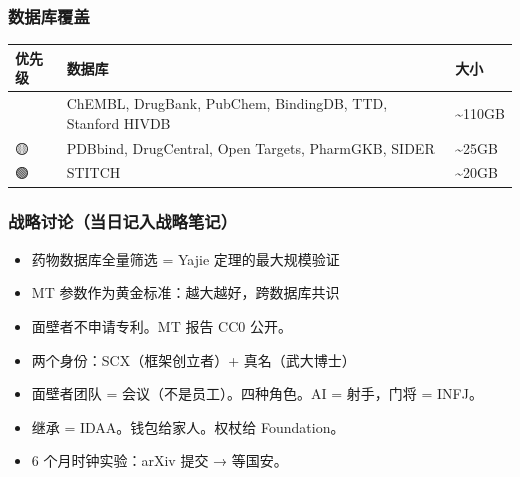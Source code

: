 \documentclass[
  12pt,
]{ctexart}
\providecommand{\tightlist}{%
  \setlength{\itemsep}{0pt}\setlength{\parskip}{0pt}}
\begin{document}
\subsubsection{数据库覆盖}\label{ux6570ux636eux5e93ux8986ux76d6}

\begin{longtable}[]{@{}
  >{\centering\arraybackslash}p{}
  >{\raggedright\arraybackslash}p{}
  >{\centering\arraybackslash}p{}@{}}
\toprule\noalign{}
\begin{minipage}[b]{\linewidth}\centering
优先级
\end{minipage} & \begin{minipage}[b]{\linewidth}\raggedright
数据库
\end{minipage} & \begin{minipage}[b]{\linewidth}\centering
大小
\end{minipage} \\
\midrule\noalign{}
\endhead
\bottomrule\noalign{}
\endlastfoot
🔴 & ChEMBL, DrugBank, PubChem, BindingDB, TTD, Stanford HIVDB &
\textasciitilde110GB \\
🟡 & PDBbind, DrugCentral, Open Targets, PharmGKB, SIDER &
\textasciitilde25GB \\
🟢 & STITCH & \textasciitilde20GB \\
\end{longtable}

\subsubsection{战略讨论（当日记入战略笔记）}\label{ux6218ux7565ux8ba8ux8bbaux5f53ux65e5ux8bb0ux5165ux6218ux7565ux7b14ux8bb0}

\begin{itemize}
\tightlist
\item
  药物数据库全量筛选 = Yajie 定理的最大规模验证
\item
  MT 参数作为黄金标准：越大越好，跨数据库共识
\item
  面壁者不申请专利。MT 报告 CC0 公开。
\item
  两个身份：SCX（框架创立者）+ 真名（武大博士）
\item
  面壁者团队 = 会议（不是员工）。四种角色。AI = 射手，门将 = INFJ。
\item
  继承 = IDAA。钱包给家人。权杖给 Foundation。
\item
  6 个月时钟实验：arXiv 提交 → 等国安。
\end{itemize}
\end{document}

